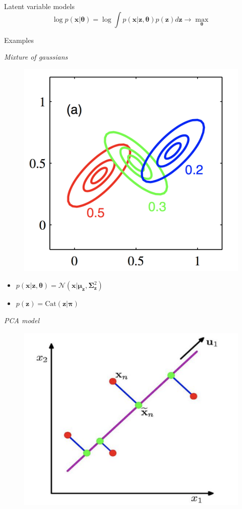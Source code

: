 \documentclass{beamer}
\newcommand{\bx}{\mathbf{x}}
\newcommand{\bz}{\mathbf{z}}
\newcommand{\btheta}{\boldsymbol{\theta}}
\begin{document}
\begin{frame}{Latent variable models}
    \[
    \log p(\bx | \btheta) = \log \int p(\bx | \bz, \btheta) p(\bz) d\bz \rightarrow \max_{\btheta}
    \]
    \vspace{-0.6cm}
    \begin{block}{Examples}
    \begin{minipage}[t]{0.45\columnwidth}
		\textit{Mixture of gaussians} \\
		\vspace{-0.5cm}
		\begin{figure}
			\centering
			\includegraphics[width=0.75\linewidth]{figs/mixture_of_gaussians.png}
		\end{figure}
		\vspace{-0.5cm}
	    \begin{itemize}
	        \item $p(\bx | \bz, \btheta) = \mathcal{N}(\bx | \boldsymbol{\mu}_\bz, \boldsymbol{\Sigma}^2_\bz)$
	        \item $p(\bz) = \text{Cat}(\bz | \boldsymbol{\pi})$
	    \end{itemize}
	\end{minipage}%
	\begin{minipage}[t]{0.53\columnwidth}
		\textit{PCA model} \\
		\vspace{-0.5cm}
		\begin{figure}
			\centering
			\includegraphics[width=.7\linewidth]{figs/pca.png}

\end{figure}
\end{minipage}
\end{block}
\end{frame}
\end{document}
